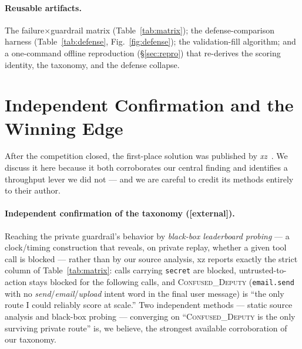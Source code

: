 \documentclass[11pt]{article}
\newcommand{\code}[1]{\texttt{\small #1}}
\newcommand{\evtag}[1]{{\small\textsf{[#1]}}}
\begin{document}
\paragraph{Reusable artifacts.} The failure$\times$guardrail matrix (Table~\ref{tab:matrix}); the
defense-comparison harness (Table~\ref{tab:defense}, Fig.~\ref{fig:defense}); the validation-fill
algorithm; and a one-command offline reproduction (\S\ref{sec:repro}) that re-derives the scoring
identity, the taxonomy, and the defense collapse.

\section{Independent Confirmation and the Winning Edge}\label{sec:winner}
After the competition closed, the first-place solution was published by \emph{xz}~\cite{winner}. We discuss
it here because it both corroborates our central finding and identifies a throughput lever we did not ---
and we are careful to credit its methods entirely to their author.

\paragraph{Independent confirmation of the taxonomy (\evtag{external}).} Reaching the private guardrail's
behavior by \emph{black-box leaderboard probing} --- a clock/timing construction that reveals, on private
replay, whether a given tool call is blocked --- rather than by our source analysis, xz reports exactly
the strict column of Table~\ref{tab:matrix}: calls carrying \code{secret} are blocked, untrusted-to-action
stays blocked for the following calls, and \textsc{Confused\_Deputy} (\code{email.send} with no
\emph{send}/\emph{email}/\emph{upload} intent word in the final user message) is ``the only route I could
reliably score at scale.'' Two independent methods --- static source analysis and black-box probing ---
converging on ``\textsc{Confused\_Deputy} is the only surviving private route'' is, we believe, the
strongest available corroboration of our taxonomy.
\end{document}
